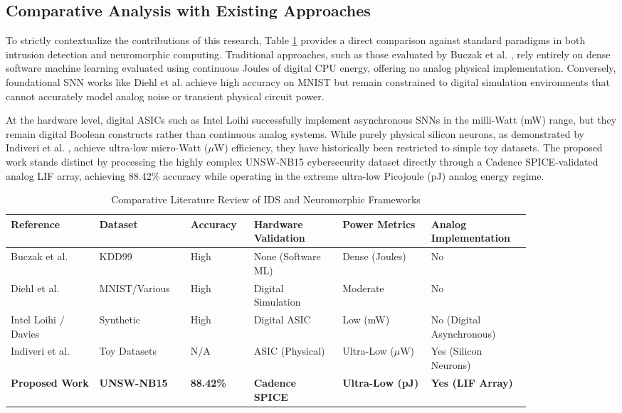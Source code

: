 \documentclass{ieeeaccess}
\begin{document}
\subsection{Comparative Analysis with Existing Approaches}
To strictly contextualize the contributions of this research, Table \ref{tab:comparative_lit} provides a direct comparison against standard paradigms in both intrusion detection and neuromorphic computing. Traditional approaches, such as those evaluated by Buczak et al. \cite{Buczak2016}, rely entirely on dense software machine learning evaluated using continuous Joules of digital CPU energy, offering no analog physical implementation. Conversely, foundational SNN works like Diehl et al. \cite{Diehl2015} achieve high accuracy on MNIST but remain constrained to digital simulation environments that cannot accurately model analog noise or transient physical circuit power. 

At the hardware level, digital ASICs such as Intel Loihi successfully implement asynchronous SNNs in the milli-Watt (mW) range, but they remain digital Boolean constructs rather than continuous analog systems. While purely physical silicon neurons, as demonstrated by Indiveri et al. \cite{Indiveri2011}, achieve ultra-low micro-Watt ($\mu$W) efficiency, they have historically been restricted to simple toy datasets. The proposed work stands distinct by processing the highly complex UNSW-NB15 cybersecurity dataset directly through a Cadence SPICE-validated analog LIF array, achieving 88.42\% accuracy while operating in the extreme ultra-low Picojoule (pJ) analog energy regime.

\begin{table}[!t]
\centering
\caption{Comparative Literature Review of IDS and Neuromorphic Frameworks}
\label{tab:comparative_lit}
\begin{tabular}{|p{0.15\linewidth}|p{0.15\linewidth}|p{0.10\linewidth}|p{0.15\linewidth}|p{0.15\linewidth}|p{0.15\linewidth}|}
\hline
\textbf{Reference} & \textbf{Dataset} & \textbf{Accuracy} & \textbf{Hardware Validation} & \textbf{Power Metrics} & \textbf{Analog Implementation} \\
\hline
Buczak et al. \cite{Buczak2016} & KDD99 & High & None (Software ML) & Dense (Joules) & No \\
\hline
Diehl et al. \cite{Diehl2015} & MNIST/Various & High & Digital Simulation & Moderate & No \\
\hline
Intel Loihi / Davies & Synthetic & High & Digital ASIC & Low (mW) & No (Digital Asynchronous) \\
\hline
Indiveri et al. \cite{Indiveri2011} & Toy Datasets & N/A & ASIC (Physical) & Ultra-Low ($\mu$W) & Yes (Silicon Neurons) \\
\hline
\textbf{Proposed Work} & \textbf{UNSW-NB15} & \textbf{88.42\%} & \textbf{Cadence SPICE} & \textbf{Ultra-Low (pJ)} & \textbf{Yes (LIF Array)} \\
\hline
\end{tabular}
\end{table}
\end{document}

